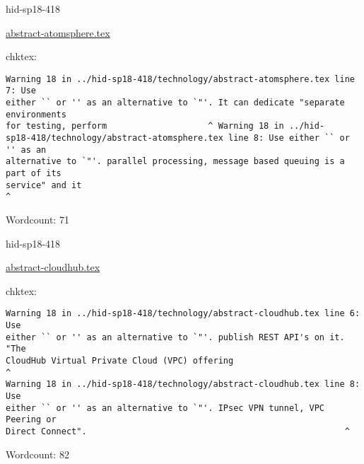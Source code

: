 

\begin{IU}

hid-sp18-418

\href{https://github.com/cloudmesh-community/hid-sp18-418/blob/master//technology/abstract-atomsphere.tex}{abstract-atomsphere.tex}

 
chktex:
\begin{tiny}
\begin{verbatim}
Warning 18 in ../hid-sp18-418/technology/abstract-atomsphere.tex line 7: Use
either `` or '' as an alternative to `"'. It can dedicate "separate environments
for testing, perform                    ^ Warning 18 in ../hid-
sp18-418/technology/abstract-atomsphere.tex line 8: Use either `` or '' as an
alternative to `"'. parallel processing, message based queuing is a part of its
service" and it
^
\end{verbatim}
\end{tiny}

Wordcount: 71

\end{IU}



\begin{IU}

hid-sp18-418

\href{https://github.com/cloudmesh-community/hid-sp18-418/blob/master//technology/abstract-cloudhub.tex}{abstract-cloudhub.tex}

 
chktex:
\begin{tiny}
\begin{verbatim}
Warning 18 in ../hid-sp18-418/technology/abstract-cloudhub.tex line 6: Use
either `` or '' as an alternative to `"'. publish REST API's on it. "The
CloudHub Virtual Private Cloud (VPC) offering                              ^
Warning 18 in ../hid-sp18-418/technology/abstract-cloudhub.tex line 8: Use
either `` or '' as an alternative to `"'. IPsec VPN tunnel, VPC Peering or
Direct Connect".                                                   ^
\end{verbatim}
\end{tiny}

Wordcount: 82

\end{IU}



